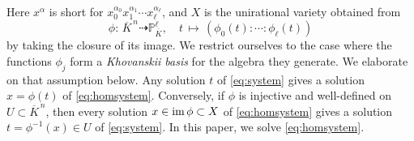 \documentclass[12pt]{article}
\theoremstyle{definition}
\theoremstyle{remark}
\begin{document}
Here $x^\alpha$ is short for $x_0^{\alpha_0}x_1^{\alpha_1} \cdots x_\ell^{\alpha_\ell}$, and $X$ is the unirational variety obtained from
\[ \phi: \, \overline{K}^{\, n} \dashrightarrow \mathbb{P}^\ell_{\overline{K}}, \quad t \, \mapsto \, (\phi_0(t) : \cdots : \phi_\ell(t) ) \]
by taking the closure of its image. We restrict ourselves to the case where the functions $\phi_j$ form a \emph{Khovanskii basis} for the algebra they generate. We elaborate on that assumption below. Any solution $t$ of \eqref{eq:system} gives a solution $x = \phi(t)$ of \eqref{eq:homsystem}. Conversely, if $\phi$ is injective and well-defined on $U \subset \overline{K}^{\,n}$, then every solution $x \in {\rm im}\, \phi \subset X$ of \eqref{eq:homsystem} gives a solution $t = \phi^{-1}(x) \in U$ of \eqref{eq:system}. In this paper, we solve \eqref{eq:homsystem}. %
\end{document}
